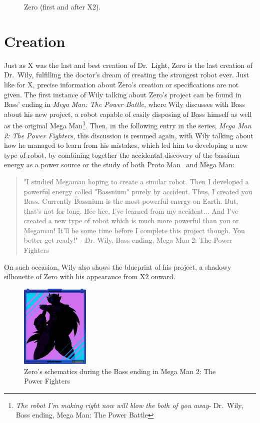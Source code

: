 \begin{figure}[htp]
	\caption{Zero (first and after X2).}
\end{figure}

\section{Creation}
Just as X was the last and best creation of Dr.~Light, Zero is the last creation of Dr.~Wily, fulfilling the doctor's dream of creating the strongest robot ever. 
Just like for X, precise information about Zero's creation or specifications are not given. The first instance of Wily talking about Zero's project can be found in Bass' ending in \textit{Mega Man: The Power Battle}, where Wily discusses with Bass about his new project, a robot capable of easily disposing of Bass himself as well as the original Mega Man\footnote{\textit{The robot I'm making right now will blow the both of you away}- Dr.~Wily, Bass ending, Mega Man: The Power Battle}. Then, in the following entry in the series, \textit{ Mega Man 2: The Power Fighters}, this discussion is resumed again, with Wily talking about how he managed to learn from his mistakes, which led him to developing a new type of robot, by combining together the accidental discovery of the bassium energy as a power source or the study of both Proto Man~\cite{art:mmnetwork:24_mavs} and Mega Man:
\begin{quote}
	"I studied Megaman hoping to create a similar robot. Then I developed a powerful energy called "Bassnium" purely by accident. Thus, I created you Bass. Currently Bassnium is the most powerful energy on Earth. But, that's not for long. Hee hee, I've learned from my accident... And I've created a new type of robot which is much more powerful than you or Megaman! It'll be some time before I complete this project though. You better get ready!" - Dr. Wily, Bass ending, Mega Man 2: The Power Fighters
\end{quote}
On such occasion, Wily also shows the blueprint of his project, a shadowy silhouette of Zero with his appearance from X2 onward.

\begin{figure}[htp]
	\centering
	\includegraphics[height=4cm]{figures/Characters/MM2TPF_Zero.png}
	\caption{Zero's schematics during the Bass ending in Mega Man 2: The Power Fighters}
\end{figure}

